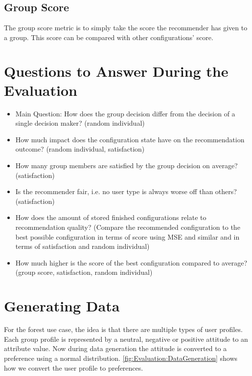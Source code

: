 \subsection{Group Score}
The group score metric is to simply take the score the recommender has given to a group. This score can be compared with other configurations' score.


\section{Questions to Answer During the Evaluation}
\label{sec:Evaluation:Questions}

\begin{itemize}
    \item Main Question: How does the group decision differ from the decision of a single decision maker? (random individual)
    \item How much impact does the configuration state have on the recommendation outcome? (random individual, satisfaction)
    \item How many group members are satisfied by the group decision on average? (satisfaction)
    \item Is the recommender fair, i.e. no user type is always worse off than others? (satisfaction)
    \item How does the amount of stored finished configurations relate to recommendation quality? (Compare the recommended configuration to the best possible configuration in terms of score using MSE and similar and in terms of satisfaction and random individual) 
    \item How much higher is the score of the best configuration compared to average? (group score, satisfaction, random individual)
\end{itemize}

\section{Generating Data}
\label{sec:Evaluation:GeneratingGroups}

For the forest use case, the idea is that there are multiple types of user profiles. Each group profile is represented by a neutral, negative or positive attitude to an attribute value. Now during data generation the attitude is converted to a preference using a normal distribution. \autoref{fig:Evaluation:DataGeneration} shows how we convert the user profile to preferences.

